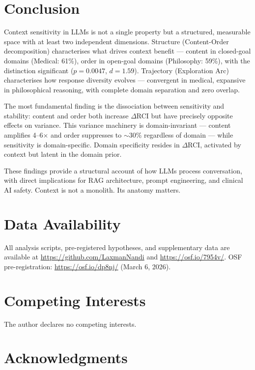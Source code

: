 \documentclass[11pt,a4paper]{article}
\begin{document}
\section{Conclusion}

Context sensitivity in LLMs is not a single property but a structured, measurable space with at least two independent dimensions. Structure (Content-Order decomposition) characterises what drives context benefit --- content in closed-goal domains (Medical: 61\%), order in open-goal domains (Philosophy: 59\%), with the distinction significant ($p = 0.0047$, $d = 1.59$). Trajectory (Exploration Arc) characterises how response diversity evolves --- convergent in medical, expansive in philosophical reasoning, with complete domain separation and zero overlap.

The most fundamental finding is the dissociation between sensitivity and stability: content and order both increase $\Delta$RCI but have precisely opposite effects on variance. This variance machinery is domain-invariant --- content amplifies 4--6$\times$ and order suppresses to $\sim$30\% regardless of domain --- while sensitivity is domain-specific. Domain specificity resides in $\Delta$RCI, activated by context but latent in the domain prior.

These findings provide a structural account of how LLMs process conversation, with direct implications for RAG architecture, prompt engineering, and clinical AI safety. Context is not a monolith. Its anatomy matters.

\section*{Data Availability}

All analysis scripts, pre-registered hypotheses, and supplementary data are available at \url{https://github.com/LaxmanNandi} and \url{https://osf.io/7954v/}. OSF pre-registration: \url{https://osf.io/dp8nj/} (March 6, 2026).

\section*{Competing Interests}

The author declares no competing interests.

\section*{Acknowledgments}
\end{document}
